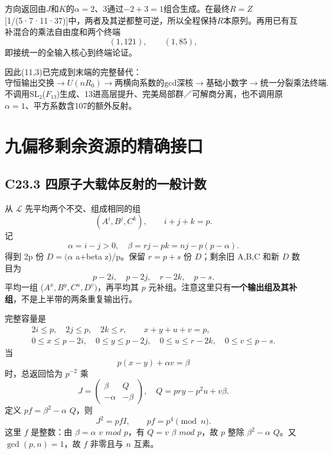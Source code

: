 \documentclass[11pt,a4paper]{article}
\theoremstyle{definition}
\numberwithin{equation}{section}
\begin{document}
{方向返回由\ensuremath{J}和\ensuremath{K}的\ensuremath{\alpha =2}、3通过−\ensuremath{2+3=1}组合生成。在最终\ensuremath{R=Z}{[}1/(5·7·11·37){]}中，两者及其逆都整可逆，所以全程保持\ensuremath{R}本原列。再用已有互补混合的乘法自由度和两个终端} \[
(1,121),\qquad(1,85),
\] {即接统一的全输入核心到终端论证。}

{因此(11,3)已完成到末端的完整替代：} \[
\text{守恒输出交换}
\to U(nR_0)
\to \text{两横向系数的gcd深核}
\to \text{基础小数字}
\to \text{统一分裂乘法终端}.
\] {不调用SL₂(\ensuremath{F}₁₃)生成、13进高层提升、完美局部群／可解商分离，也不调用原\ensuremath{\alpha =1}、平方系数含107的额外反射。}


\section{九偏移剩余资源的精确接口}\label{construct:nine-offsets}
\subsection*{\texorpdfstring{{C23.3} {四原子大载体反射的一般计数}}{C23.3 四原子大载体反射的一般计数}}\label{C23-h152}

{从} \(\mathcal L\) {先平均两个不交、组成相同的组} \[
(A^i,B^j,C^k),\qquad i+j+k=p.
\] {记} \[
\alpha=i-j>0,\quad \beta=rj-pk=nj-p(p-\alpha).
\] {得到} {2p} {份} {\ensuremath{D=(\alpha }} {a+beta} {z)/p。保留} {\ensuremath{r=p+s}} {份} {\ensuremath{D}；剩余旧} {A,B,C} {和新} {\ensuremath{D}} {数目为} \[
p-2i,\quad p-2j,\quad r-2k,\quad p-s.
\] {平均一组} {(\ensuremath{A^{x},B^{y},C^{u},D^{v})}，再平均其} {\ensuremath{p}} {元补组。注意这里只有}\textbf{{一个输出组及其补组}}{，不是上半带的两条重复输出行。}

{完整容量是} \[
\begin{gathered}
2i\le p,\quad2j\le p,\quad2k\le r,\qquad x+y+u+v=p,\\
0\le x\le p-2i,\quad0\le y\le p-2j,\quad
0\le u\le r-2k,\quad0\le v\le p-s.
\end{gathered}
\tag{C23.3.1}
\] {当} \[
p(x-y)+\alpha v=\beta
\tag{C23.3.2}
\] {时，总返回恰为} {\ensuremath{p^{-2}}} {乘} \[
J=\begin{pmatrix}\beta&Q\\-\alpha&-\beta\end{pmatrix},
\quad Q=pry-p^2u+v\beta.
\tag{C23.3.3}
\] {定义} {\ensuremath{pf=\beta ^{2}-\alpha }} {\ensuremath{Q}，则} \[
J^2=pfI,\qquad pf=p^4\pmod n.
\tag{C23.3.4}
\] {这里} {\ensuremath{f}} {是整数：由} {\ensuremath{\beta =\alpha }} {\ensuremath{v}} {\ensuremath{mod}} {\ensuremath{p}，有} {\ensuremath{Q=v}} {\ensuremath{\beta }} {\ensuremath{mod}} {\ensuremath{p}，故} {\ensuremath{p}} {整除} {\ensuremath{\beta ^{2}-\alpha }} {\ensuremath{Q}。又} {\ensuremath{\operatorname{gcd}(p,n)=1}，故} {\ensuremath{f}} {非零且与} {\ensuremath{n}} {互素。}
\end{document}
